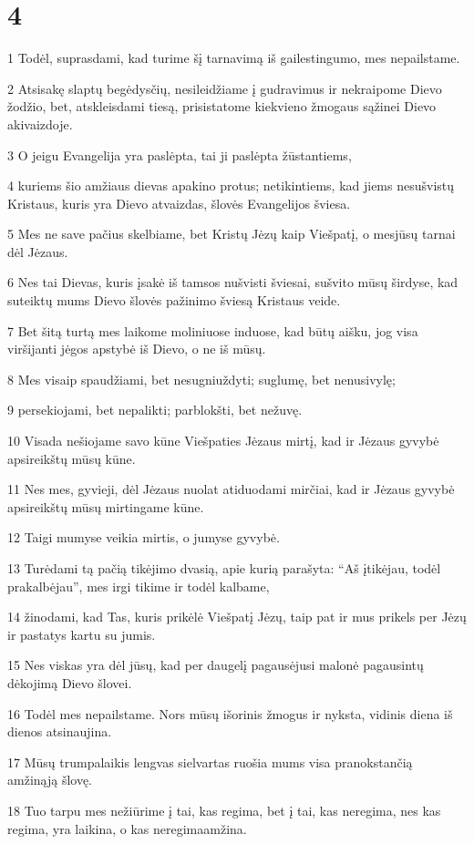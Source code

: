 \chapter{4}


\par 1 Todėl, suprasdami, kad turime šį tarnavimą iš gailestingumo, mes nepailstame. 
\par 2 Atsisakę slaptų begėdysčių, nesileidžiame į gudravimus ir nekraipome Dievo žodžio, bet, atskleisdami tiesą, prisistatome kiekvieno žmogaus sąžinei Dievo akivaizdoje. 
\par 3 O jeigu Evangelija yra paslėpta, tai ji paslėpta žūstantiems, 
\par 4 kuriems šio amžiaus dievas apakino protus; netikintiems, kad jiems nesušvistų Kristaus, kuris yra Dievo atvaizdas, šlovės Evangelijos šviesa. 
\par 5 Mes ne save pačius skelbiame, bet Kristų Jėzų kaip Viešpatį, o mes­jūsų tarnai dėl Jėzaus. 
\par 6 Nes tai Dievas, kuris įsakė iš tamsos nušvisti šviesai, sušvito mūsų širdyse, kad suteiktų mums Dievo šlovės pažinimo šviesą Kristaus veide. 
\par 7 Bet šitą turtą mes laikome moliniuose induose, kad būtų aišku, jog visa viršijanti jėgos apstybė iš Dievo, o ne iš mūsų. 
\par 8 Mes visaip spaudžiami, bet nesugniuždyti; suglumę, bet nenusivylę; 
\par 9 persekiojami, bet nepalikti; parblokšti, bet nežuvę. 
\par 10 Visada nešiojame savo kūne Viešpaties Jėzaus mirtį, kad ir Jėzaus gyvybė apsireikštų mūsų kūne. 
\par 11 Nes mes, gyvieji, dėl Jėzaus nuolat atiduodami mirčiai, kad ir Jėzaus gyvybė apsireikštų mūsų mirtingame kūne. 
\par 12 Taigi mumyse veikia mirtis, o jumyse gyvybė. 
\par 13 Turėdami tą pačią tikėjimo dvasią, apie kurią parašyta: “Aš įtikėjau, todėl prakalbėjau”, mes irgi tikime ir todėl kalbame, 
\par 14 žinodami, kad Tas, kuris prikėlė Viešpatį Jėzų, taip pat ir mus prikels per Jėzų ir pastatys kartu su jumis. 
\par 15 Nes viskas yra dėl jūsų, kad per daugelį pagausėjusi malonė pagausintų dėkojimą Dievo šlovei. 
\par 16 Todėl mes nepailstame. Nors mūsų išorinis žmogus ir nyksta, vidinis diena iš dienos atsinaujina. 
\par 17 Mūsų trumpalaikis lengvas sielvartas ruošia mums visa pranokstančią amžinąją šlovę. 
\par 18 Tuo tarpu mes nežiūrime į tai, kas regima, bet į tai, kas neregima, nes kas regima, yra laikina, o kas neregima­amžina.


